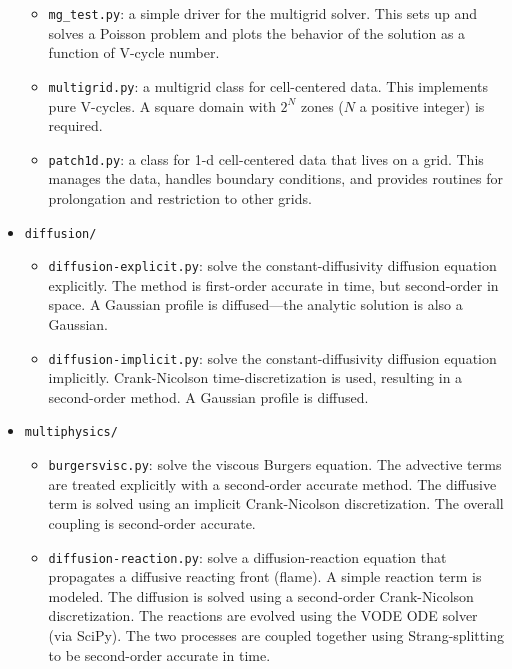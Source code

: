 \begin{itemize}
\begin{itemize}
  \item {\tt mg\_test.py}: a simple driver for the multigrid solver.
    This sets up and solves a Poisson problem and plots the behavior 
    of the solution as a function of V-cycle number.

  \item{\tt multigrid.py}: a multigrid class for cell-centered data.
    This implements pure V-cycles.  A square domain with $2^N$ zones
    ($N$ a positive integer) is required.

  \item {\tt patch1d.py}: a class for 1-d cell-centered data that
    lives on a grid.  This manages the data, handles boundary
    conditions, and provides routines for prolongation and restriction
    to other grids.

  \end{itemize}

\item {\tt diffusion/}

  \begin{itemize}
    \item {\tt diffusion-explicit.py}: solve the constant-diffusivity
      diffusion equation explicitly.  The method is first-order
      accurate in time, but second-order in space.  A Gaussian profile
      is diffused---the analytic solution is also a Gaussian.

    \item {\tt diffusion-implicit.py}: solve the constant-diffusivity
      diffusion equation implicitly.  Crank-Nicolson time-discretization
      is used, resulting in a second-order method.  A Gaussian profile
      is diffused.

  \end{itemize}
  
\item {\tt multiphysics/}

  \begin{itemize}
  \item {\tt burgersvisc.py}: solve the viscous Burgers equation.
     The advective terms are treated explicitly with a second-order
     accurate method.  The diffusive term is solved using an 
     implicit Crank-Nicolson discretization.  The overall coupling
     is second-order accurate.

  \item {\tt diffusion-reaction.py}: solve a diffusion-reaction
    equation that propagates a diffusive reacting front (flame).  A
    simple reaction term is modeled.  The diffusion is solved using
    a second-order Crank-Nicolson discretization.  The reactions
    are evolved using the VODE ODE solver (via SciPy).  The two
    processes are coupled together using Strang-splitting to be
    second-order accurate in time.
     

  \end{itemize}

\end{itemize}


